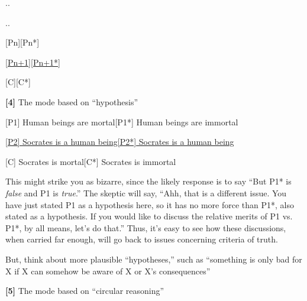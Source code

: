 \documentclass[11pt]{article}
\begin{document}
\hspace*{2.5mm}.\hspace*{40mm}.
\vspace*{1mm}

\hspace*{2.5mm}.\hspace*{40mm}.
\vspace*{1mm}

[Pn]\hspace*{34mm}[Pn*]
\vspace*{1mm}

\underline{[Pn+1]}\hspace*{30mm}\underline{[Pn+1*]}
\vspace*{1mm}

[C]\hspace*{36mm}[C*]
\vspace*{3mm}

\noindent \textbf{[4]} The mode based on ``hypothesis''
\vspace*{2mm}

[P1] Human beings are mortal\hspace*{30mm}[P1*] Human beings are immortal
\vspace*{1mm}

\underline{[P2] Socrates is a human being}\hspace*{29.5mm}\underline{[P2*] Socrates is a human being}
\vspace*{1mm}

[C] Socrates is mortal\hspace*{43.5mm}[C*] Socrates is immortal
\vspace*{2mm}

\noindent This might strike you as bizarre, since the likely response is to say ``But P1* is \emph{false} and P1 is \emph{true}.'' The skeptic will say, ``Ahh, that is a different issue. You have just stated P1 as a hypothesis here, so it has no more force than P1*, also stated as a hypothesis. If you would like to discuss the relative merits of P1 vs. P1*, by all means, let's do that.'' Thus, it's easy to see how these discussions, when carried far enough, will go back to issues concerning criteria of truth.
\vspace*{2mm}

\noindent But, think about more plausible ``hypotheses,'' such as ``something is only bad for X if X can somehow be aware of X or X's consequences''
\vspace*{3mm}

\noindent \textbf{[5]} The mode based on ``circular reasoning''
\vspace*{2mm}
\end{document}
